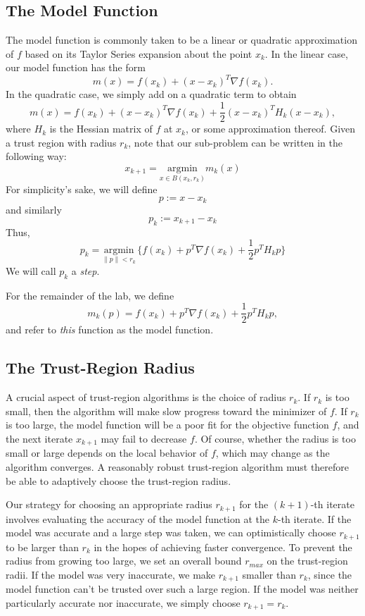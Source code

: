 \subsection*{The Model Function}
The model function is commonly taken to be a linear or quadratic approximation of
$f$ based on its Taylor Series expansion about the point $x_k$. In the linear case,
our model function has the form
\[
m(x) = f(x_k) + (x-x_k)^T \nabla f(x_k).
\]
In the quadratic case, we simply add on a quadratic term to obtain
\[
m(x) = f(x_k) + (x-x_k)^T \nabla f(x_k) + \frac{1}{2}(x - x_k)^T H_k (x-x_k),
\]
where $H_k$ is the Hessian matrix of $f$ at $x_k$, or some approximation thereof.
Given a trust region with radius $r_k$, note that our sub-problem can be
written in the following way:
\[
x_{k+1} = \underset{x \in B(x_k, r_k)}{\text{argmin}} m_k(x)
\]
For simplicity's sake, we will define
\[
p := x - x_k
\]
and similarly
\[
p_k := x_{k+1} - x_k
\]
Thus,
\begin{equation}
p_k = \underset{\|p\| < r_k}{\text{argmin}}\, \{f(x_k) + p^T \nabla f(x_k) + \frac{1}{2}p^T H_k p\}
\label{eq:step}
\end{equation}
We will call $p_k$ a \emph{step}.

For the remainder of the lab, we define
\[
m_k(p) = f(x_k) + p^T \nabla f(x_k) + \frac{1}{2}p^T H_k p,
\]
and refer to \emph{this} function as the model function.

\subsection*{The Trust-Region Radius}
A crucial aspect of trust-region algorithms is the choice of radius $r_k$. If $r_k$ is too small, then the algorithm will
make slow progress toward the minimizer of $f$. If $r_k$ is too large, the model function will be a poor fit for the objective
function $f$, and the next iterate $x_{k+1}$ may fail to decrease $f$.
Of course, whether the radius is too small or large depends on the local behavior of $f$, which may change as the algorithm
converges. A reasonably robust trust-region algorithm must therefore be able to adaptively choose the trust-region radius.

Our strategy for choosing an appropriate radius $r_{k+1}$ for the $(k+1)$-th iterate involves evaluating the accuracy
of the model function at the $k$-th iterate. If the model was accurate and a large step was taken, we can optimistically choose $r_{k+1}$ to be larger
than $r_k$ in the hopes of achieving faster convergence.
To prevent the radius from growing too large, we set an overall bound $r_{max}$ on the trust-region radii.
If the model was very inaccurate, we make $r_{k+1}$ smaller than
$r_k$, since the model function can't be trusted over such a large region. If the model was neither particularly accurate
nor inaccurate, we simply choose $r_{k+1} = r_k$.

